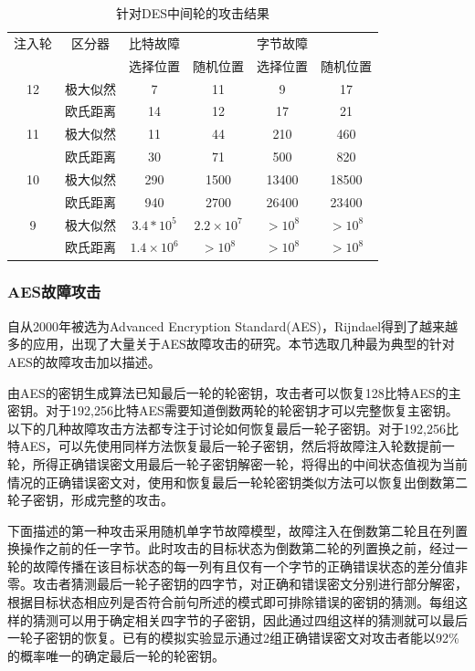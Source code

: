 \documentclass[a4paper,12pt]{article}
\begin{document}
\begin{CJK}{UTF8}{gkai}
\begin{table}
\centering
\begin{tabular}{*{6}{c}}
注入轮 & 区分器 & 比特故障 &  & 字节故障  &   \\
\cline{3-3} \cline{5-5}
 & & 选择位置 & 随机位置 & 选择位置  & 随机位置  \\
\hline
12 & 极大似然 & 7 & 11 & 9 & 17 \\
   & 欧氏距离 & 14 & 12 & 17 & 21 \\
11 & 极大似然 & 11 & 44 & 210 & 460 \\
   & 欧氏距离 & 30 & 71 & 500 & 820 \\
10 & 极大似然 & 290 & 1500 & 13400 & 18500 \\
   & 欧氏距离 & 940 & 2700 & 26400 & 23400 \\
9  & 极大似然 & $3.4*10^5$ & $2.2 \times 10^7$ & $>10^8$ & $>10^8$ \\
   & 欧氏距离 & $1.4 \times 10^6$ & $>10^8$ & $>10^8$ & $>10^8$ \\
\end{tabular}
\caption{针对DES中间轮的攻击结果}
\label{tab:3_1}
\end{table}

\subsubsection{AES故障攻击}

自从2000年被选为Advanced Encryption Standard(AES)，Rijndael得到了越来越多的应用，出现了大量关于AES故障攻击的研究。本节选取几种最为典型的针对AES的故障攻击加以描述。

由AES的密钥生成算法已知最后一轮的轮密钥，攻击者可以恢复128比特AES的主密钥。对于192,256比特AES需要知道倒数两轮的轮密钥才可以完整恢复主密钥。以下的几种故障攻击方法都专注于讨论如何恢复最后一轮子密钥。对于192,256比特AES，可以先使用同样方法恢复最后一轮子密钥，然后将故障注入轮数提前一轮，所得正确错误密文用最后一轮子密钥解密一轮，将得出的中间状态值视为当前情况的正确错误密文对，使用和恢复最后一轮轮密钥类似方法可以恢复出倒数第二轮子密钥，形成完整的攻击。

下面描述的第一种攻击采用随机单字节故障模型，故障注入在倒数第二轮且在列置换操作之前的任一字节。此时攻击的目标状态为倒数第二轮的列置换之前，经过一轮的故障传播在该目标状态的每一列有且仅有一个字节的正确错误状态的差分值非零。攻击者猜测最后一轮子密钥的四字节，对正确和错误密文分别进行部分解密，根据目标状态相应列是否符合前句所述的模式即可排除错误的密钥的猜测。每组这样的猜测可以用于确定相关四字节的子密钥，因此通过四组这样的猜测就可以最后一轮子密钥的恢复。已有的模拟实验显示通过2组正确错误密文对攻击者能以92\%的概率唯一的确定最后一轮的轮密钥。


\end{CJK}
\end{document}
